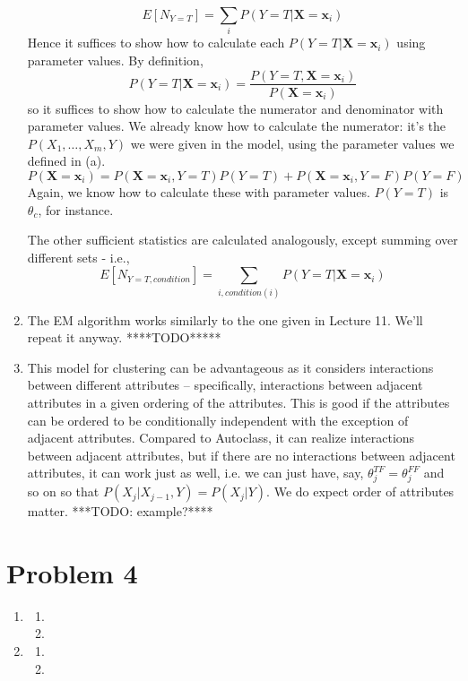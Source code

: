 \documentclass{article}
\begin{document}
\begin{enumerate}
$$E[N_{Y=T}]=\sum_i P(Y=T|\mathbf X = \mathbf x_i)$$
Hence it suffices to show how to calculate each $P(Y=T|\mathbf X=\mathbf x_i)$
using parameter values. 
By definition,
$$P(Y=T|\mathbf X = \mathbf x_i)=\frac{P(Y=T, \mathbf X = \mathbf x_i)}{P(\mathbf X = \mathbf x_i)}$$
so it suffices to show how to calculate the numerator and denominator with
parameter values. We already know how to calculate the numerator: it's the 
$P(X_1,\ldots,X_m,Y)$ we were given in the model, using the parameter values
we defined in (a). 
$$P(\mathbf X = \mathbf x_i)=P(\mathbf X = \mathbf x_i, Y=T)P(Y=T)+P(\mathbf X = \mathbf x_i, Y=F)P(Y=F)$$
Again, we know how to calculate these with parameter values. $P(Y=T)$ is $\theta_c$, for instance.

The other sufficient statistics are calculated analogously, except summing
over different sets - i.e., 
$$E[N_{Y=T,condition}]=\sum_{i, condition(i)} P(Y=T|\mathbf X=\mathbf x_i)$$

\item The EM algorithm works similarly to the one given in Lecture 11. We'll repeat it anyway. 
****TODO*****
 
\item This model for clustering can be advantageous as it considers interactions
  between different attributes -- specifically, interactions between adjacent
  attributes in a given ordering of the attributes. This is good if the 
  attributes can be ordered to be conditionally independent with the exception 
  of adjacent attributes. Compared to Autoclass, it can realize interactions
  between adjacent attributes, but if there are no interactions between adjacent
  attributes, it can work just as well, i.e. we can just have, say, 
  $\theta_j^{TF}=\theta_j^{FF}$ and so on so that $P(X_j|X_{j-1},Y)=P(X_j|Y)$. 
  We do expect order of attributes matter. ***TODO: example?****
\end{enumerate}
\section*{Problem 4}
\begin{enumerate}
\item 
  \begin{enumerate}
  \item 
  \item 
  \end{enumerate}
\item 
  \begin{enumerate}
  \item 
  \item 
  \end{enumerate}
\end{enumerate}
\end{document}

